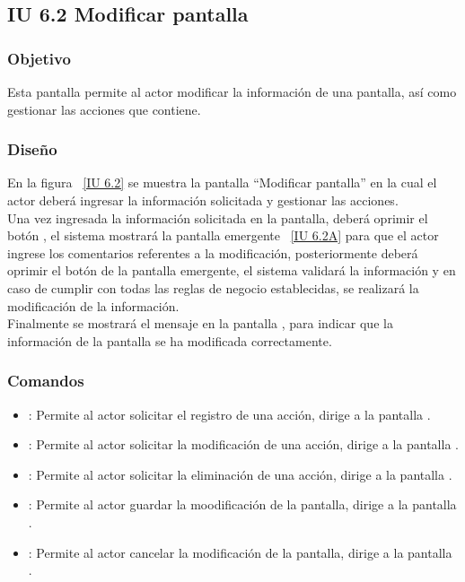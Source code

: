 \subsection{IU 6.2 Modificar pantalla}

\subsubsection{Objetivo}
	
	Esta pantalla permite al actor modificar la información de una pantalla, así como gestionar las acciones que contiene.

\subsubsection{Diseño}

    En la figura ~\ref{IU 6.2} se muestra la pantalla ``Modificar pantalla'' en la cual el actor deberá ingresar la información solicitada y gestionar las acciones. \\
    
    Una vez ingresada la información solicitada en la pantalla, deberá oprimir el botón , el sistema mostrará la pantalla emergente ~\ref{IU 6.2A} 
    para que el actor ingrese los comentarios referentes a la modificación, posteriormente deberá oprimir el botón  de la pantalla emergente,
    el sistema validará la información y en caso de cumplir con todas las reglas de negocio establecidas, se realizará la modificación de la información.\\
    
    Finalmente se mostrará el mensaje  en la pantalla , para indicar que la información de la pantalla se ha modificada correctamente.        



\subsubsection{Comandos}
\begin{itemize}
	\item {}: Permite al actor solicitar el registro de una acción, dirige a la pantalla .
	\item \btnEditar[Modificar]: Permite al actor solicitar la modificación de una acción, dirige a la pantalla .
	\item \btnEliminar[Eliminar]: Permite al actor solicitar la eliminación de una acción, dirige a la pantalla .
	\item {}: Permite al actor guardar la moodificación de la pantalla, dirige a la pantalla .
	\item {}: Permite al actor cancelar la modificación de la pantalla, dirige a la pantalla .
\end{itemize}

